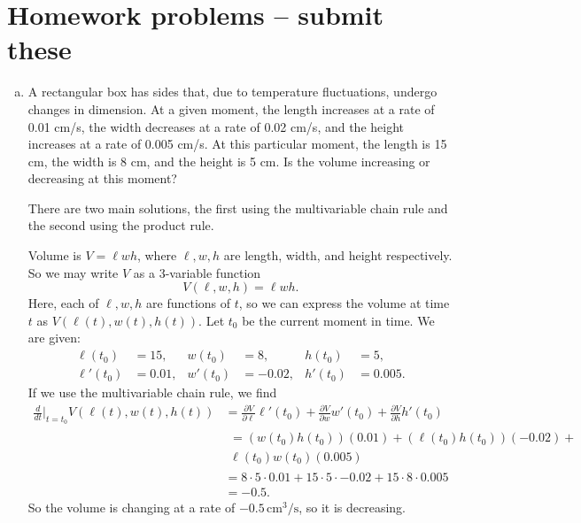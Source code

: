 \newpage

\section{Homework problems -- submit these}
\begin{problem}\leavevmode
  \begin{enumerate}[(a)]
    \item A rectangular box has sides that, due to temperature fluctuations, undergo changes in dimension. At a given moment, the length increases at a rate of 0.01 cm/s, the width decreases at a rate of 0.02 cm/s, and the height increases at a rate of 0.005 cm/s. At this particular moment, the length is 15 cm, the width is 8 cm, and the height is 5 cm. Is the volume increasing or decreasing at this moment?
    \begin{solution}
      There are two main solutions, the first using the multivariable chain rule and the second using the product rule.

      Volume is $V=\ell w h$, where $\ell,w,h$ are length, width, and height respectively. So we may write $V$ as a 3-variable function
      \[V(\ell,w,h)=\ell w h.\]
      Here, each of $\ell,w,h$ are functions of $t$, so we can express the volume at time $t$ as $V(\ell(t),w(t),h(t))$. Let $t_0$ be the current moment in time. We are given:
      \begin{align*}
        \ell(t_0) &= 15,&w(t_0)&=8,&h(t_0)&=5,\\
        \ell'(t_0) &= 0.01,&w'(t_0)&=-0.02,&h'(t_0)&=0.005.
      \end{align*}
      If we use the multivariable chain rule, we find
      \[\begin{split}
        \frac d{dt}\Big|_{t=t_0}V(\ell(t),w(t),h(t)) &= \frac{\partial V}{\partial\ell}\ell'(t_0)+\frac{\partial V}{\partial w}w'(t_0)+\frac{\partial V}{\partial h}h'(t_0)\\
        & \begin{multlined}= (w(t_0)h(t_0))(0.01)+(\ell(t_0) h(t_0))(-0.02)+\\
          \ell(t_0) w(t_0)(0.005)\end{multlined}\\
        &=8\cdot 5\cdot 0.01+15\cdot 5\cdot -0.02+15\cdot 8\cdot 0.005\\
        &=-0.5.
      \end{split}\]
      So the volume is changing at a rate of $-0.5\,\mathrm{cm^3/s}$, so it is decreasing.


\end{solution}
\end{enumerate}
\end{problem}
